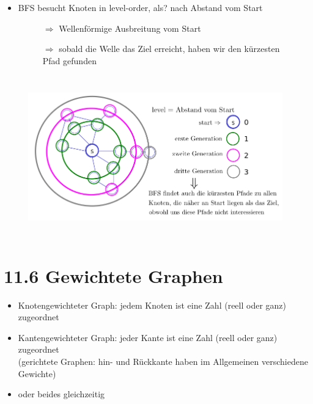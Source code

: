     \begin{itemize}
        \item BFS besucht Knoten in level-order, als? nach Abstand vom Start
    \end{itemize}
    \begin{figure}[htbp]
        \begin{minipage}{5cm}
            \vspace*{0mm}
            \begin{itemize}
            \item[$\Rightarrow$] Wellenförmige Ausbreitung vom Start
            \item[$\Rightarrow$] sobald die Welle das Ziel erreicht, haben wir den kürzesten Pfad gefunden
            \end{itemize}
        \end{minipage}
        \begin{minipage}{10cm}
            \includegraphics[width=11cm,height=7cm,keepaspectratio]{./Pictures/kurWeg.png}
        \end{minipage}
    \end{figure}

    \section*{11.6 Gewichtete Graphen}
        \begin{itemize}
        \item Knotengewichteter Graph: jedem Knoten ist eine Zahl (reell oder ganz) zugeordnet
        \item Kantengewichteter Graph: jeder Kante ist eine Zahl (reell oder ganz) zugeordnet \\
        (gerichtete Graphen: hin- und Rückkante haben im Allgemeinen verschiedene Gewichte)
        \item oder beides gleichzeitig
        \end{itemize}

